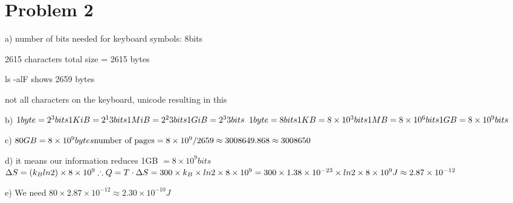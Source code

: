 \section*{Problem 2}

\begin{note}{a)}
number of bits needed for keyboard symbols:
8bits

2615 characters
total size = 2615 bytes 

ls -alF shows
2659 bytes

not all characters on the keyboard, unicode resulting in this
\end{note}

\begin{note}{b)}
$\\
1 byte = 2^3 bits \\
1KiB = 2^13 bits \\
1MiB = 2^23 bits \\
1GiB = 2^33 bits \\
$
$\\
1 byte = 8 bits \\
1KB = 8\times 10^3 bits \\
1MB = 8\times 10^6 bits \\
1GB = 8\times 10^9 bits $
\end{note}

\begin{note}{c)}
$\\
80GB = 8 \times 10^9 bytes \\
\text{number of pages} = 8\times 10^9 / 2659 \approx 3008649.868 \approx 3008650$
\end{note}

\begin{note}{d)}
it means our information reduces 1GB $= 8\times 10^9 bits$
$\\
\Delta S = (k_Bln2)\times 8\times 10^9 \\
\therefore Q=T\cdot\Delta S = 300 \times k_B \times ln 2 \times 8 \times 10^9 = 300 \times 1.38 \times 10^{-23} \times ln 2 \times 8 \times 10^9 J \approx 2.87\times 10^{-12}$
\end{note}

\begin{note}{e)}
We need $80 \times 2.87 \times 10^{-12} \approx 2.30 \times 10^{-10} J$
\end{note}